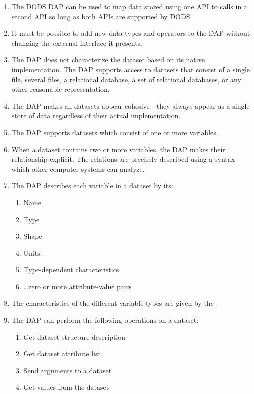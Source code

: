 \begin{enumerate}

\item The DODS DAP can be used to map data stored using one API to
  calls in a second API so long as both APIs are supported by DODS\@.

\item It must be possible to add new data types and operators to the DAP
  without changing the external interface it presents.

\item The DAP does not characterize the dataset based on its native
  implementation. The DAP supports access to datasets that consist of a
  single file, several files, a relational database, a set of relational
  databases, or any other reasonable representation.

\item The DAP makes all datasets appear cohesive---they always appear as a
  single store of data regardless of their actual implementation. 

\item The DAP supports datasets which consist of one or more variables.

\item When a dataset contains two or more variables, the DAP makes their
  relationship explicit. The relations are precisely described using a syntax
  which other computer systems can analyze.

\item The DAP describes each variable in a dataset by its:

\begin{enumerate}
\item Name
\item Type
\item Shape
\item Units. 
\item Type-dependent characteristics
\item \ldots zero or more attribute-value pairs
\end{enumerate}

\item The characteristics of the different variable types are given by the
  \dm.

\item The DAP can perform the following operations on a dataset:

\begin{enumerate}
\item Get dataset structure description
\item Get dataset attribute list
\item Send arguments to a dataset
\item Get values from the dataset
\end{enumerate}

\end{enumerate}

